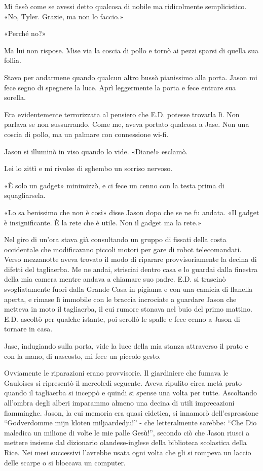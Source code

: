 Mi fissò come se avessi detto qualcosa di nobile ma ridicolmente
semplicistico. «No, Tyler. Grazie, ma non lo faccio.»

«Perché no?»

Ma lui non rispose. Mise via la coscia di pollo e tornò ai pezzi sparsi
di quella sua follia.

Stavo per andarmene quando qualcun altro bussò pianissimo alla porta.
Jason mi fece segno di spegnere la luce. Aprì leggermente la porta e
fece entrare sua sorella.

Era evidentemente terrorizzata al pensiero che E.D. potesse trovarla lì.
Non parlava se non sussurrando. Come me, aveva portato qualcosa a Jase.
Non una coscia di pollo, ma un palmare con connessione wi-fi.

Jason si illuminò in viso quando lo vide. «Diane!» esclamò.

Lei lo zittì e mi rivolse di sghembo un sorriso nervoso.

«È solo un gadget» minimizzò, e ci fece un cenno con la testa prima di
squagliarsela.

«Lo sa benissimo che non è così» disse Jason dopo che se ne fu andata.
«Il gadget è insignificante. È la rete che è utile. Non il gadget ma la
rete.»

Nel giro di un'ora stava già consultando un gruppo di fissati della
costa occidentale che modificavano piccoli motori per gare di robot
telecomandati. Verso mezzanotte aveva trovato il modo di riparare
provvisoriamente la decina di difetti del tagliaerba. Me ne andai,
strisciai dentro casa e lo guardai dalla finestra della mia camera
mentre andava a chiamare suo padre. E.D. si trascinò svogliatamente
fuori dalla Grande Casa in pigiama e con una camicia di flanella aperta,
e rimase lì immobile con le braccia incrociate a guardare Jason che
metteva in moto il tagliaerba, il cui rumore stonava nel buio del primo
mattino. E.D. ascoltò per qualche istante, poi scrollò le spalle e fece
cenno a Jason di tornare in casa.

Jase, indugiando sulla porta, vide la luce della mia stanza attraverso
il prato e con la mano, di nascosto, mi fece un piccolo gesto.

Ovviamente le riparazioni erano provvisorie. Il giardiniere che fumava
le Gauloises si ripresentò il mercoledì seguente. Aveva ripulito circa
metà prato quando il tagliaerba si inceppò e quindi si spense una volta
per tutte. Ascoltando all'ombra degli alberi imparammo almeno una decina
di utili imprecazioni fiamminghe. Jason, la cui memoria era quasi
eidetica, si innamorò dell'espressione ``Godverdomme mijn kloten
miljaardedju!'' - che letteralmente sarebbe: ``Che Dio maledica un
milione di volte le mie palle Gesù!'', secondo ciò che Jason riuscì a
mettere insieme dal dizionario olandese-inglese della biblioteca
scolastica della Rice. Nei mesi successivi l'avrebbe usata ogni volta
che gli si rompeva un laccio delle scarpe o si bloccava un computer.

